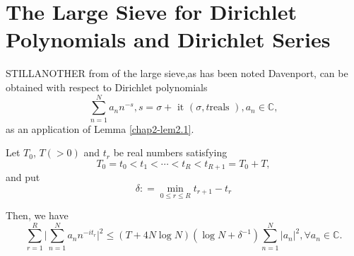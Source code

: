 
\chapter[The Large Sieve for Dirichlet Polynomials...]{The Large Sieve for Dirichlet Polynomials and Dirichlet
  Series}\label{chap4}%

STILL\pageoriginale ANOTHER from of the large sieve,as has been noted
Davenport, can be obtained with respect to Dirichlet polynomials 
\begin{equation*}
\sum_{n=1}^{N} a_n n^{-s}, s = \sigma + \text{ it } (\sigma , t \text{
  reals }),a_n \in \mathbb{C}, \tag{4.1}\label{eq4.1} 
\end{equation*}
as an application of Lemma \ref{chap2-lem2.1}.

\setcounter{section}{4}
\setcounter{theorem}{0}
\begin{theorem}\label{chap4-thm4.1} %
Let $T_0$, $T(>0)$ and $t_r$ be real numbers satisfying
\begin{equation*}
T_0 = t_0 < t_1 < \cdots <t_R < t_{R+1} = T_0 + T,
\tag{4.2}\label{eq4.2} 
\end{equation*}
and put
\begin{equation*}
\delta : = \min_{0 \leq r \leq R} t_{r+1} - t_r \tag{4.3}\label{eq4.3}
\end{equation*}

Then, we have
\begin{equation*}
\sum_{r=1}^R \bigg|\sum_{n=1}^N a_n n^{-it_r}\bigg|^2 \leq (T+4N \log
N) (\log N + \delta^{-1}) \sum_{n=1}^N |a_n|^2, \forall a_n  \in
\mathbb{C}. \tag{4.4}\label{eq4.4} 
\end{equation*}
\end{theorem}

